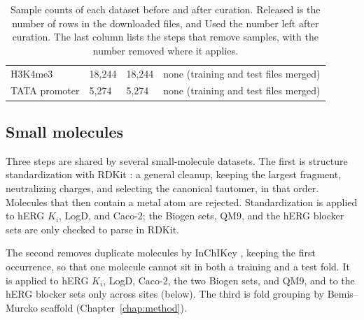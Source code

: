 \begin{table}[htbp]
\begin{adjustbox}{max width=\textwidth,max totalheight=0.78\textheight}
\begin{tabular}{P{3.4cm}P{1.6cm}P{1.4cm}P{7.0cm}}
H3K4me3 & 18,244 & 18,244 & none (training and test files merged) \\
TATA promoter & 5,274 & 5,274 & none (training and test files merged) \\
\bottomrule
\end{tabular}
\end{adjustbox}
\caption[Sample counts of each dataset before and after curation.]{Sample counts of each dataset before and after curation. Released is the number of rows in the downloaded files, and Used the number left after curation. The last column lists the steps that remove samples, with the number removed where it applies.}
\label{tab:curation_counts}
\end{table}

\subsection{Small molecules}\label{app:datasets:smallmol}

Three steps are shared by several small-molecule datasets. The first is structure standardization with RDKit \citep{rdkit}: a general cleanup, keeping the largest fragment, neutralizing charges, and selecting the canonical tautomer, in that order. Molecules that then contain a metal atom are rejected. Standardization is applied to hERG $K_i$, LogD, and Caco-2; the Biogen sets, QM9, and the hERG blocker sets are only checked to parse in RDKit.

The second removes duplicate molecules by InChIKey \citep{Heller2015}, keeping the first occurrence, so that one molecule cannot sit in both a training and a test fold. It is applied to hERG $K_i$, LogD, Caco-2, the two Biogen sets, and QM9, and to the hERG blocker sets only across sites (below). The third is fold grouping by Bemis--Murcko scaffold \citep{Bemis1996} (Chapter~\ref{chap:method}).

